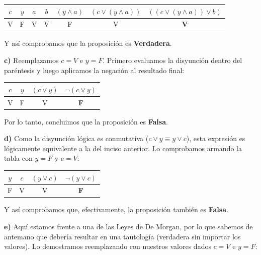 \begin{center}
\begin{tabular}{|c|c|c|c|c|c|c|}
\hline
$c$ & $y$ & $a$ & $b$ & $(y \wedge a)$ & $(c \vee (y \wedge a))$ & $((c \vee (y \wedge a)) \vee b)$ \\
\hline
V & F & V & V & F & V & \textbf{V} \\
\hline
\end{tabular}
\end{center}

Y así comprobamos que la proposición es \textbf{Verdadera}.

\vspace{0.4cm}
\textbf{c)} Reemplazamos $c=V$ e $y=F$. Primero evaluamos la disyunción dentro del paréntesis y luego aplicamos la negación al resultado final:

\begin{center}
\begin{tabular}{|c|c|c|c|}
\hline
$c$ & $y$ & $(c \vee y)$ & $\neg(c \vee y)$ \\
\hline
V & F & V & \textbf{F} \\ 
\hline
\end{tabular}
\end{center}

Por lo tanto, concluimos que la proposición es \textbf{Falsa}.

\vspace{0.4cm}
\textbf{d)} Como la disyunción lógica es conmutativa ($c \vee y \equiv y \vee c$), esta expresión es lógicamente equivalente a la del inciso anterior. Lo comprobamos armando la tabla con $y=F$ y $c=V$:

\begin{center}
\begin{tabular}{|c|c|c|c|}
\hline
$y$ & $c$ & $(y \vee c)$ & $\neg(y \vee c)$ \\
\hline
F & V & V & \textbf{F} \\
\hline
\end{tabular}
\end{center}

Y así comprobamos que, efectivamente, la proposición también es \textbf{Falsa}.

\vspace{0.4cm}
\textbf{e)} Aquí estamos frente a una de las Leyes de De Morgan, por lo que sabemos de antemano que debería resultar en una tautología (verdadera sin importar los valores). Lo demostramos reemplazando con nuestros valores dados $c=V$ e $y=F$:

